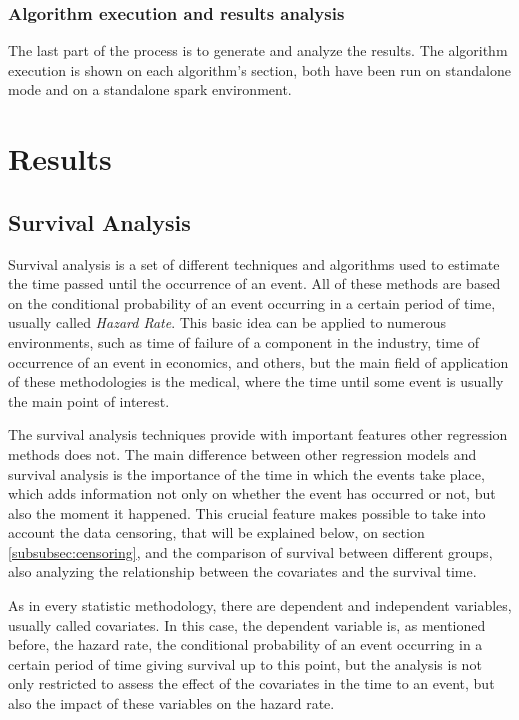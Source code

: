 \documentclass[11pt]{book} %
\begin{document}
  \subsection{Algorithm execution and results analysis}

    The last part of the process is to generate and analyze the results. The algorithm execution is shown on each algorithm's section, both have been run on standalone mode and on a standalone spark environment.



\chapter{Results}
  \label{sec:results}

  \section{Survival Analysis}

    Survival analysis is a set of different techniques and algorithms used to estimate the time passed until the occurrence of an event. All of these methods are based on the conditional probability of an event occurring in a certain period of time, usually called \emph{Hazard Rate}. This basic idea can be applied to numerous environments, such as time of failure of a component in the industry, time of occurrence of an event in economics, and others, but the main field of application of these methodologies is the medical, where the time until some event is usually the main point of interest.

    The survival analysis techniques provide with important features other regression methods does not. The main difference between other regression models and survival analysis is the importance of the time in which the events take place, which adds information not only on whether the event has occurred or not, but also the moment it happened. This crucial feature makes possible to take into account the data censoring, that will be explained below, on section \ref{subsubsec:censoring}, and the comparison of survival between different groups, also analyzing the relationship between the covariates and the survival time.

    As in every statistic methodology, there are dependent and independent variables, usually called covariates. In this case, the dependent variable is, as mentioned before, the hazard rate, the conditional probability of an event occurring in a certain period of time giving survival up to this point, but the analysis is not only restricted to assess the effect of the covariates in the time to an event, but also the impact of these variables on the hazard rate.
\end{document}
